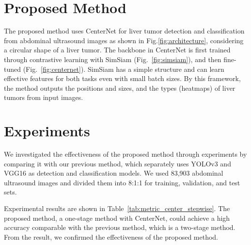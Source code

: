 \documentclass[conference]{IEEEtran}
\begin{document}
        \section{Proposed Method}
        The proposed method uses CenterNet\cite{centernet} for liver tumor detection and classification from abdominal ultrasound images as shown in Fig.\ref{fig:architecture}, considering a circular shape of a liver tumor.
        The backbone in CenterNet is first trained through contrastive learning with SimSiam\cite{simsiam} (Fig.~\ref{fig:simsiam}), and then fine-tuned (Fig.~\ref{fig:centernet}).
        SimSiam has a simple structure and can learn effective features for both tasks even with small batch sizes.
        By this framework, the method outputs the positions and sizes, and the types (heatmaps) of liver tumors from input images.

    \section{Experiments}
        We investigated the effectiveness of the proposed method through experiments by comparing it with our previous method\cite{prestudy_det,prestudy_cls}, which separately uses YOLOv3 and VGG16 as detection and classification models.
        We used 83,903 abdominal ultrasound images and divided them into 8:1:1 for training, validation, and test sets.

        Experimental results are shown in Table~\ref{tab:metric_center_stepwise}.
        The proposed method, a one-stage method with CenterNet, could achieve a high accuracy comparable with the previous method, which is a two-stage method.
        From the result, we confirmed the effectiveness of the proposed method.
\end{document}

